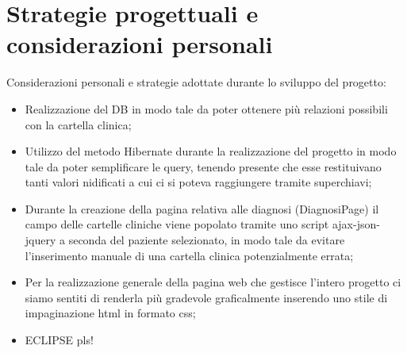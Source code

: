 \documentclass[a4paper,titlepage]{article}
\begin{document}
\part{Strategie progettuali e considerazioni personali}

Considerazioni personali e strategie adottate durante lo sviluppo del progetto:

\begin{itemize}[leftmargin=1.5cm, topsep=0.5cm, itemsep=0.2cm]

\item Realizzazione del DB in modo tale da poter ottenere più relazioni possibili con la cartella clinica;
\item Utilizzo del metodo Hibernate durante la realizzazione del progetto in modo tale da poter semplificare le query, tenendo presente che esse restituivano tanti valori nidificati a cui ci si poteva raggiungere tramite superchiavi;
\item Durante la creazione della pagina relativa alle diagnosi (DiagnosiPage) il campo delle cartelle cliniche viene popolato tramite uno script ajax-json-jquery a seconda del paziente selezionato, in modo tale da evitare l'inserimento manuale di una cartella clinica potenzialmente errata;
\item Per la realizzazione generale della pagina web che gestisce l'intero progetto ci siamo sentiti di renderla più gradevole graficalmente inserendo uno stile di impaginazione html in formato css;
\item ECLIPSE pls!

\end{itemize}
\end{document}
